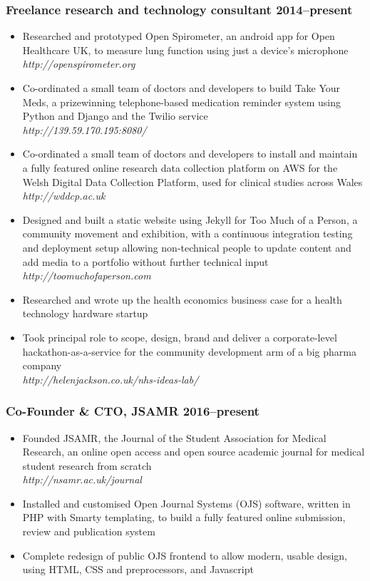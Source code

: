 \documentclass[a4paper, oneside, final, 11pt]{scrartcl} %
\begin{document}
\subsubsection*{Freelance research and technology consultant \hfill 2014--present}  
\normalfont
\begin{itemize}
	\item Researched and prototyped Open Spirometer, an android app for Open Healthcare UK, to measure lung function using just a device's microphone\\
	\textit{http://openspirometer.org}
	\item Co-ordinated a small team of doctors and developers to build Take Your Meds, a prizewinning telephone-based medication reminder system using Python and Django and the Twilio service\\
	\textit{http://139.59.170.195:8080/}
	\item Co-ordinated a small team of doctors and developers to install and maintain a fully featured online research data collection platform on AWS for the Welsh Digital Data Collection Platform, used for clinical studies across Wales\\
	\textit{http://wddcp.ac.uk}
	\item Designed and built a static website using Jekyll for Too Much of a Person, a community movement and exhibition, with a continuous integration testing and deployment setup allowing non-technical people to update content and add media to a portfolio without further technical input\\
	\textit{http://toomuchofaperson.com}
	\item Researched and wrote up the health economics business case for a health technology hardware startup
	\item Took principal role to scope, design, brand and deliver a corporate-level hackathon-as-a-service for the community development arm of a big pharma company\\
	\textit{http://helenjackson.co.uk/nhs-ideas-lab/}
\end{itemize}

\smallskip 

\subsubsection*{Co-Founder \& CTO, JSAMR \hfill 2016--present} 
\normalfont
\begin{itemize}
	\item Founded JSAMR, the Journal of the Student Association for Medical Research, an online open access and open source academic journal for medical student research from scratch \\
	\textit{http://nsamr.ac.uk/journal}
	\item Installed and customised Open Journal Systems (OJS) software, written in PHP with Smarty templating, to build a fully featured online submission, review and publication system
	\item Complete redesign of public OJS frontend to allow modern, usable design, using HTML, CSS and preprocessors, and Javascript
\end{itemize}
\end{document}

